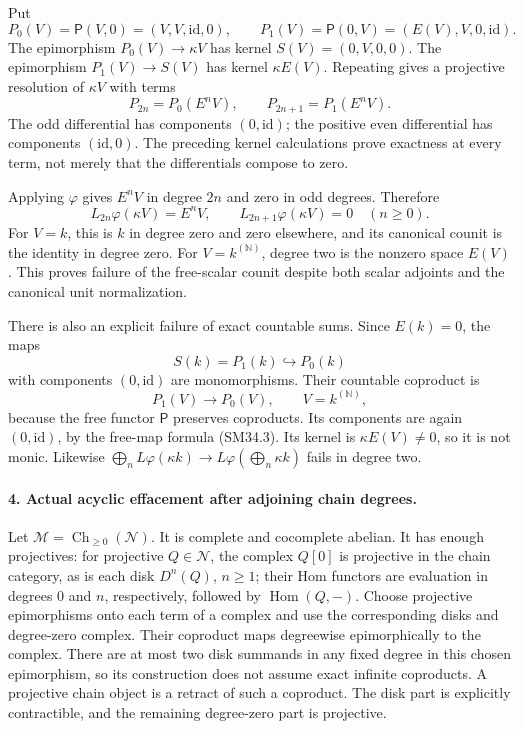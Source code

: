 Put
\[
 P_0(V)=\mathsf P(V,0)=(V,V,\mathrm{id},0),\qquad
 P_1(V)=\mathsf P(0,V)=(E(V),V,0,\mathrm{id}).                \tag{SM34.6}
\]
The epimorphism \(P_0(V)\to\kappa V\) has kernel
\(S(V)=(0,V,0,0)\).  The epimorphism
\(P_1(V)\to S(V)\) has kernel \(\kappa E(V)\).
Repeating gives a projective resolution of \(\kappa V\)
with terms
\[
       P_{2n}=P_0(E^nV),\qquad P_{2n+1}=P_1(E^nV).
                                                               \tag{SM34.7}
\]
The odd differential has components \((0,\mathrm{id})\);
the positive even differential has components
\((\mathrm{id},0)\).  The preceding kernel calculations
prove exactness at every term, not merely that the
differentials compose to zero.

Applying \(\varphi\) gives \(E^nV\) in degree \(2n\)
and zero in odd degrees.  Therefore
\[
 L_{2n}\varphi(\kappa V)=E^nV,\qquad
 L_{2n+1}\varphi(\kappa V)=0\quad(n\ge0).                    \tag{SM34.8}
\]
For \(V=k\), this is \(k\) in degree zero and zero
elsewhere, and its canonical counit is the identity in
degree zero.  For \(V=k^{(\mathbb N)}\), degree two is
the nonzero space \(E(V)\).  This proves failure of the
free-scalar counit despite both scalar adjoints and the
canonical unit normalization.

There is also an explicit failure of exact countable sums.
Since \(E(k)=0\), the maps
\[
                S(k)=P_1(k)\hookrightarrow P_0(k)
\]
with components \((0,\mathrm{id})\) are monomorphisms.
Their countable coproduct is
\[
                    P_1(V)\longrightarrow P_0(V),
                        \qquad V=k^{(\mathbb N)},            \tag{SM34.9}
\]
because the free functor \(\mathsf P\) preserves
coproducts.  Its components are again
\((0,\mathrm{id})\), by the free-map formula (SM34.3).
Its kernel is \(\kappa E(V)\ne0\), so it is not monic.
Likewise \(\bigoplus_nL\varphi(\kappa k)\to
L\varphi(\bigoplus_n\kappa k)\) fails in degree two.

\paragraph{4. Actual acyclic effacement after adjoining chain degrees.}
Let \(\mathcal M=\operatorname{Ch}_{\ge0}(\mathcal N)\).
It is complete and cocomplete abelian.  It has enough
projectives: for projective \(Q\in\mathcal N\), the
complex \(Q[0]\) is projective in the chain category, as
is each disk \(D^n(Q)\), \(n\ge1\); their Hom functors
are evaluation in degrees \(0\) and \(n\), respectively,
followed by \(\operatorname{Hom}(Q,-)\).  Choose projective
epimorphisms onto each term of a complex and use the
corresponding disks and degree-zero complex.  Their
coproduct maps degreewise epimorphically to the complex.
There are at most two disk summands in any fixed degree
in this chosen epimorphism, so its construction does not
assume exact infinite coproducts.  A projective chain
object is a retract of such a coproduct.  The disk part
is explicitly contractible, and the remaining degree-zero
part is projective.

